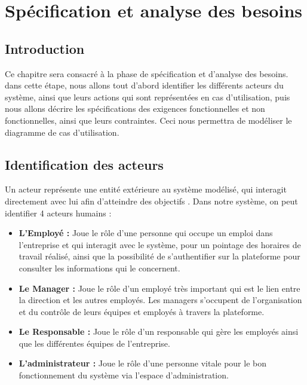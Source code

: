 \chapter{Spécification et analyse des besoins
}
\renewcommand{\headrulewidth}{1pt}


\section{Introduction}
Ce chapitre sera consacré à la phase de spécification et d’analyse des besoins.
dans cette étape, nous allons tout d’abord identifier les différents acteurs du
système, ainsi que leurs actions qui sont représentées en cas d’utilisation,
puis nous allons décrire les spécifications des exigences fonctionnelles et non
fonctionnelles, ainsi que leurs contraintes. Ceci nous permettra de modéliser le
diagramme de cas d’utilisation. 

\section{Identification des acteurs}
Un acteur représente une entité extérieure au système modélisé, qui interagit
directement avec lui afin d’atteindre des objectifs \cite{4}. Dans notre
système, on peut identifier 4 acteurs humains :
    
    
\begin{itemize}
    \item[\textbullet] \textbf{L’Employé :} Joue le rôle d’une personne 			qui occupe un emploi dans l’entreprise et qui interagit avec le 			système, pour un pointage des horaires de travail réalisé, ainsi 			que la possibilité de s’authentifier sur la plateforme pour 				consulter les informations qui le concernent.
    \item[\textbullet] \textbf{Le Manager :} Joue le rôle d’un employé 				très important qui est le lien entre la direction et les autres 			employés. Les managers s’occupent de l’organisation et du contrôle 		de leurs équipes et employés à travers la plateforme.
    \item[\textbullet] \textbf{Le Responsable :} Joue le rôle d’un 					responsable qui gère les employés ainsi que les différentes 				équipes de l’entreprise.
    \item[\textbullet] \textbf{L’administrateur :} Joue le rôle d’une 				personne vitale pour le bon fonctionnement du système via l’espace 		d’administration.
\end{itemize}
    
